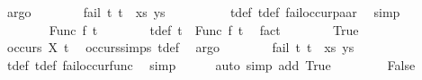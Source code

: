 \begin{isabellebody}
\ argo\isanewline
\ \ \ \ \ \ \isamarkupfalse%
\ {\isachardoublequoteopen}fail\ {\isacharparenleft}{\kern0pt}{\isacharparenleft}{\kern0pt}t{}{\isacharcomma}{\kern0pt}\ t{}{\isacharparenright}{\kern0pt}\ {\isacharhash}{\kern0pt}\ xs{\isacharcomma}{\kern0pt}\ ys{\isacharparenright}{\kern0pt}{\isachardoublequoteclose}\isanewline
\ \ \ \ \ \ \ \ \isamarkupfalse%
\ t{}{\isacharunderscore}{\kern0pt}def\ t{}{\isacharunderscore}{\kern0pt}def\ fail{\isacharunderscore}{\kern0pt}occur{\isacharunderscore}{\kern0pt}paar\ \isamarkupfalse%
\ simp\isanewline
\ \ \ \ \isamarkupfalse%
\isanewline
\ \ \ \ \ \ \isamarkupfalse%
\ {\isacharparenleft}{\kern0pt}Func\ f\ t{}{\isacharprime}{\kern0pt}{\isacharparenright}{\kern0pt}\isanewline
\ \ \ \ \ \ \isamarkupfalse%
\ t{}{\isacharunderscore}{\kern0pt}def{\isacharcolon}{\kern0pt}\ {\isachardoublequoteopen}t{}\ {\isacharequal}{\kern0pt}\ Func\ f\ t{}{\isacharprime}{\kern0pt}{\isachardoublequoteclose}\ \isamarkupfalse%
\ fact\isanewline
\ \ \ \ \ \ \isamarkupfalse%
\ True\isanewline
\ \ \ \ \ \ \isamarkupfalse%
\ {\isachardoublequoteopen}occurs\ X\ t{}{\isacharprime}{\kern0pt}{\isachardoublequoteclose}\ \isamarkupfalse%
\ occurs{\isachardot}{\kern0pt}simps{\isacharparenleft}{\kern0pt}{}{\isacharparenright}{\kern0pt}\ t{}{\isacharunderscore}{\kern0pt}def\ \isamarkupfalse%
\ argo\isanewline
\ \ \ \ \ \ \isamarkupfalse%
\ {\isachardoublequoteopen}fail\ {\isacharparenleft}{\kern0pt}{\isacharparenleft}{\kern0pt}t{}{\isacharcomma}{\kern0pt}\ t{}{\isacharparenright}{\kern0pt}\ {\isacharhash}{\kern0pt}\ xs{\isacharcomma}{\kern0pt}\ ys{\isacharparenright}{\kern0pt}{\isachardoublequoteclose}\isanewline
\ \ \ \ \ \ \ \ \isamarkupfalse%
\ t{}{\isacharunderscore}{\kern0pt}def\ t{}{\isacharunderscore}{\kern0pt}def\ fail{\isacharunderscore}{\kern0pt}occur{\isacharunderscore}{\kern0pt}func\ \isamarkupfalse%
\ simp\isanewline
\ \ \ \ \isamarkupfalse%
\ {\isacharparenleft}{\kern0pt}auto\ simp\ add{\isacharcolon}{\kern0pt}\ True{\isacharparenright}{\kern0pt}\isanewline
\ \ \isamarkupfalse%
\isanewline
\ \ \ \ \isamarkupfalse%
\ False\isanewline

\end{isabellebody}
